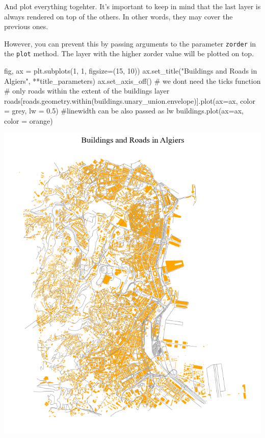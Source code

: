 \documentclass[
  letterpaper,
  DIV=11,
  numbers=noendperiod]{scrreprt}
\newenvironment{Shaded}{\begin{snugshade}}{\end{snugshade}}
\newcommand{\CommentTok}[1]{\textcolor[rgb]{0.37,0.37,0.37}{#1}}
\newcommand{\DecValTok}[1]{\textcolor[rgb]{0.68,0.00,0.00}{#1}}
\newcommand{\FloatTok}[1]{\textcolor[rgb]{0.68,0.00,0.00}{#1}}
\newcommand{\NormalTok}[1]{\textcolor[rgb]{0.00,0.23,0.31}{#1}}
\newcommand{\OperatorTok}[1]{\textcolor[rgb]{0.37,0.37,0.37}{#1}}
\newcommand{\StringTok}[1]{\textcolor[rgb]{0.13,0.47,0.30}{#1}}
\begin{document}
And plot everything togehter. It's important to keep in mind that the
last layer is always rendered on top of the others. In other words, they
may cover the previous ones.

However, you can prevent this by passing arguments to the parameter
\texttt{zorder} in the \texttt{plot} method. The layer with the higher
zorder value will be plotted on top.

\begin{Shaded}
\begin{Highlighting}[]
\NormalTok{fig, ax }\OperatorTok{=}\NormalTok{ plt.subplots(}\DecValTok{1}\NormalTok{, }\DecValTok{1}\NormalTok{, figsize}\OperatorTok{=}\NormalTok{(}\DecValTok{15}\NormalTok{, }\DecValTok{10}\NormalTok{))}
\NormalTok{ax.set\_title(}\StringTok{"Buildings and Roads in Algiers"}\NormalTok{, }\OperatorTok{**}\NormalTok{title\_parameters)}
\NormalTok{ax.set\_axis\_off() }\CommentTok{\# we don\textquotesingle{}t need the ticks function}
\CommentTok{\# only roads within the extent of the buildings layer}
\NormalTok{roads[roads.geometry.within(buildings.unary\_union.envelope)].plot(ax}\OperatorTok{=}\NormalTok{ax, color }\OperatorTok{=} \StringTok{\textquotesingle{}grey\textquotesingle{}}\NormalTok{, lw }\OperatorTok{=} \FloatTok{0.5}\NormalTok{) }\CommentTok{\#linewidth can be also passed as lw }
\NormalTok{buildings.plot(ax}\OperatorTok{=}\NormalTok{ax, color }\OperatorTok{=} \StringTok{\textquotesingle{}orange\textquotesingle{}}\NormalTok{)}
\end{Highlighting}
\end{Shaded}

\includegraphics{labs/w02_maps_files/figure-pdf/cell-19-output-1.png}
\end{document}
